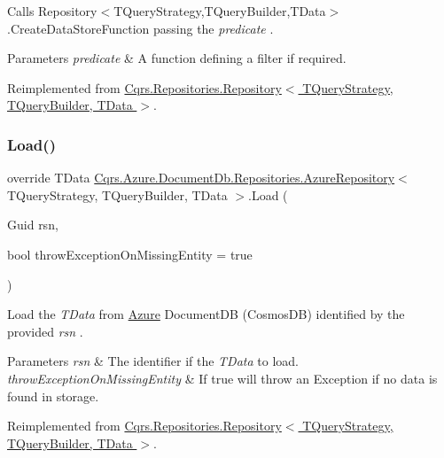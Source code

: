 Calls Repository$<$\+T\+Query\+Strategy,\+T\+Query\+Builder,\+T\+Data$>$.\+Create\+Data\+Store\+Function passing the {\itshape predicate} . 


\begin{DoxyParams}{Parameters}
{\em predicate} & A function defining a filter if required.\\
\hline
\end{DoxyParams}


Reimplemented from \hyperlink{classCqrs_1_1Repositories_1_1Repository_ab95fc66b24e8359a1e2f48a3ca2f14c1_ab95fc66b24e8359a1e2f48a3ca2f14c1}{Cqrs.\+Repositories.\+Repository$<$ T\+Query\+Strategy, T\+Query\+Builder, T\+Data $>$}.

\mbox{\label{classCqrs_1_1Azure_1_1DocumentDb_1_1Repositories_1_1AzureRepository_a22c58163e101a6cb80f891bed6114380_a22c58163e101a6cb80f891bed6114380}} 
\subsubsection{\texorpdfstring{Load()}{Load()}}
{\footnotesize\ttfamily override T\+Data \hyperlink{classCqrs_1_1Azure_1_1DocumentDb_1_1Repositories_1_1AzureRepository}{Cqrs.\+Azure.\+Document\+Db.\+Repositories.\+Azure\+Repository}$<$ T\+Query\+Strategy, T\+Query\+Builder, T\+Data $>$.Load (\begin{DoxyParamCaption}\item[{Guid}]{rsn,  }\item[{bool}]{throw\+Exception\+On\+Missing\+Entity = {\ttfamily true} }\end{DoxyParamCaption})\hspace{0.3cm}{\ttfamily [virtual]}}



Load the {\itshape T\+Data}  from \hyperlink{namespaceCqrs_1_1Azure}{Azure} Document\+DB (Cosmos\+DB) identified by the provided {\itshape rsn} . 


\begin{DoxyParams}{Parameters}
{\em rsn} & The identifier if the {\itshape T\+Data}  to load.\\
\hline
{\em throw\+Exception\+On\+Missing\+Entity} & If true will throw an Exception if no data is found in storage.\\
\hline
\end{DoxyParams}


Reimplemented from \hyperlink{classCqrs_1_1Repositories_1_1Repository_a444e9dfe4710be90940dbb6dec9d856f_a444e9dfe4710be90940dbb6dec9d856f}{Cqrs.\+Repositories.\+Repository$<$ T\+Query\+Strategy, T\+Query\+Builder, T\+Data $>$}.

